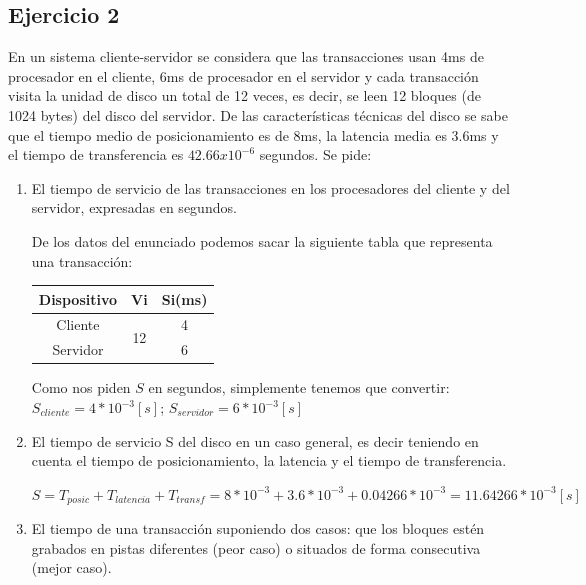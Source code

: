 \subsection{Ejercicio 2}
En un sistema cliente-servidor se considera que las transacciones usan 4ms de procesador en el cliente, 6ms de procesador en el servidor y cada transacción visita la unidad de disco un total de 12 veces, es decir, se leen 12 bloques (de 1024 bytes) del disco del servidor. De las características técnicas del disco se sabe que el tiempo medio de posicionamiento es de 8ms, la latencia media es 3.6ms y el tiempo de transferencia es  $42.66 x 10^{-6}$ segundos. Se pide:
\begin{enumerate}
    \item El tiempo de servicio de las transacciones en los procesadores del cliente y del servidor, expresadas en segundos.
    \begin{tcolorbox}[colback=white,colframe=cyan!50!black,fonttitle=\bfseries]
    De los datos del enunciado podemos sacar la siguiente tabla que representa una transacción:
    \begin{table}[H]\centering\begin{tabular}{|c|c|c|}\hline
    \textbf{Dispositivo}    & \textbf{Vi} & \textbf{Si(ms)} \\ \hline
    Cliente & \multirow{2}{*}{12}& 4  \\ \cline{1-1} \cline{3-3}
    Servidor && 6   \\ \hline
    \end{tabular}\end{table}
    Como nos piden $S$ en segundos, simplemente tenemos que convertir:\\
    $S_{cliente}=4*10^{-3}[s]$;  $S_{servidor}=6*10^{-3}[s]$
    \end{tcolorbox}
    \item El tiempo de servicio S del disco en un caso general, es decir teniendo en cuenta el tiempo de posicionamiento, la latencia y el tiempo de transferencia.
    \begin{tcolorbox}[colback=white,colframe=cyan!50!black,fonttitle=\bfseries]
$S =T_{posic}+T_{latencia}+T_{transf}=8*10^{-3}+3.6*10^{-3}+0.04266*10^{-3}=11.64266*10^{-3}[s]$
    \end{tcolorbox}
    \item El tiempo de una transacción suponiendo dos casos: que los bloques estén grabados en pistas diferentes (peor caso) o situados de forma consecutiva (mejor caso).
    \begin{tcolorbox}[colback=white,colframe=cyan!50!black,fonttitle=\bfseries]

\end{tcolorbox}
\end{enumerate}
